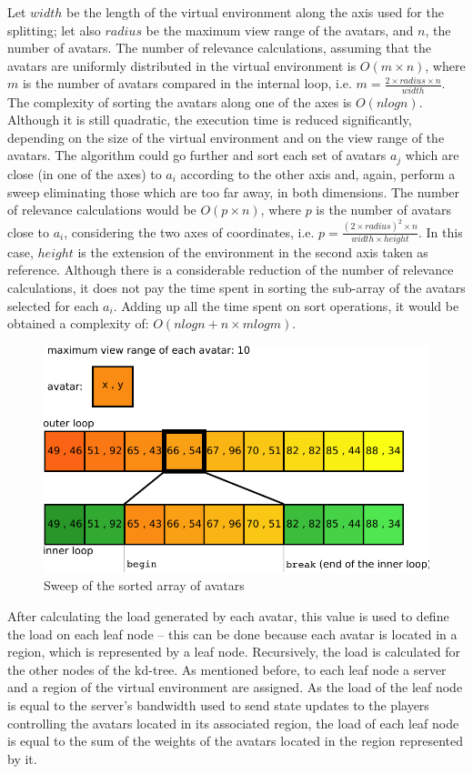 \documentclass[acmjacm]{acmtrans2m}
\begin{document}
Let $width$ be the length of the virtual environment along the axis used for the splitting; let also $radius$ be the maximum view range of the avatars, and $n$, the number of avatars. The number of relevance calculations, assuming that the avatars are uniformly distributed in the virtual environment is \mbox{$O(m \times n)$}, where $m$ is the number of avatars compared in the internal loop, i.e. \mbox{$m = \frac{2 \times radius \times n}{width}$}. The complexity of sorting the avatars along one of the axes is $O(nlogn)$. Although it is still quadratic, the execution time is reduced significantly, depending on the size of the virtual environment and on the view range of the avatars. The algorithm could go further and sort each set of avatars $a_j$ which are close (in one of the axes) to $a_i$ according to the other axis and, again, perform a sweep eliminating those which are too far away, in both dimensions. The number of relevance calculations would be \mbox{$O(p \times n)$}, where $p$ is the number of avatars close to $a_i$, considering the two axes of coordinates, i.e. \mbox{$p = \frac{(2 \times radius)^2 \times n}{width \times height}$}. In this case, $height$ is the extension of the environment in the second axis taken as reference. Although there is a considerable reduction of the number of relevance calculations, it does not pay the time spent in sorting the sub-array of the avatars selected for each $a_i$. Adding up all the time spent on sort operations, it would be obtained a complexity of: \mbox{$O(nlogn + n \times mlogm)$}.

\begin{figure}
  \centering
  \includegraphics[width=0.8\linewidth]{images/sweep}
  \caption{Sweep of the sorted array of avatars}
   \label{fig:sweep}
\end{figure}

After calculating the load generated by each avatar, this value is used to define the load on each leaf node -- this can be done because each avatar is located in a region, which is represented by a leaf node. Recursively, the load is calculated for the other nodes of the kd-tree. As mentioned before, to each leaf node a server and a region of the virtual environment are assigned. As the load of the leaf node is equal to the server's bandwidth used to send state updates to the players controlling the avatars located in its associated region, the load of each leaf node is equal to the sum of the weights of the avatars located in the region represented by it.
\end{document}
